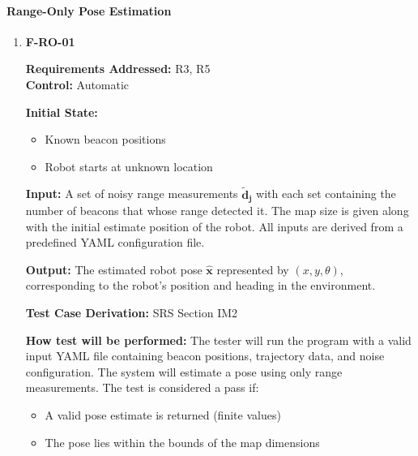 \documentclass[12pt, titlepage]{article}
\begin{document}

		
\paragraph{Range-Only Pose Estimation}

\begin{enumerate}

\item{\textbf{F-RO-01}}

\textbf{Requirements Addressed:} R3, R5\\
\textbf{Control:} Automatic
					
\textbf{Initial State: }
\begin{itemize}
  \item Known beacon positions
  \item Robot starts at unknown location
\end{itemize}
					
\textbf{Input:} A set of noisy range measurements $\mathbf{\tilde{d}_j}$ with each set containing the number of beacons that whose range detected it. The map size is given along with the initial estimate position of the robot. All inputs are derived from a predefined YAML configuration file.

\textbf{Output:} The estimated robot pose $\mathbf{\hat{x}}$ represented by $(x,y,\theta)$, corresponding to the robot's position and heading in the environment.
 

\textbf{Test Case Derivation:} SRS Section IM2
					
\textbf{How test will be performed:} The tester will run the program with a valid input YAML file containing beacon positions, trajectory data, and noise configuration. The system will estimate a pose using only range measurements. The test is considered a pass if:
\begin{itemize}
  \item A valid pose estimate is returned (finite values)
  \item The pose lies within the bounds of the map dimensions
\end{itemize}

\end{enumerate}
\end{document}

